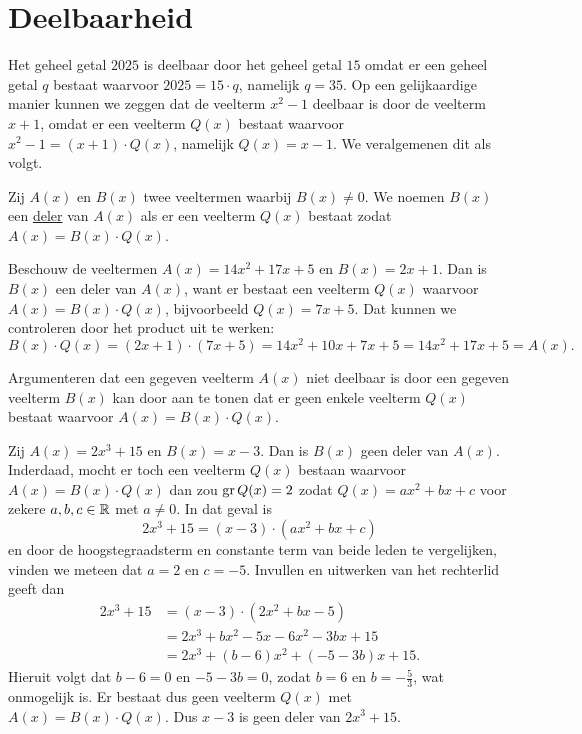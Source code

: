 \documentclass{ximera}
\begin{document}
\section{Deelbaarheid}

Het geheel getal $2025$ is deelbaar door het geheel getal $15$ omdat er een geheel getal $q$ bestaat waarvoor $2025 = 15\cdot q$, namelijk $q = 35$. Op een gelijkaardige manier kunnen we zeggen dat de veelterm $x^2-1$ deelbaar is door de veelterm $x+1$, omdat er een veelterm $Q(x)$ bestaat waarvoor $x^2-1 = (x+1)\cdot Q(x)$, namelijk $Q(x) = x-1$. We veralgemenen dit als volgt.

\begin{definition} 
Zij $A(x)$ en $B(x)$ twee veeltermen waarbij $B(x) \neq 0$. 
We noemen $B(x)$ een \underline{deler} van $A(x)$ als er een veelterm $Q(x)$ bestaat zodat $A(x) = B(x)\cdot Q(x)$.
\end{definition} 

\begin{example} 
Beschouw de veeltermen $A(x) = 14x^2+17x+5$ en $B(x) = 2x+1$. Dan is $B(x)$ een deler van $A(x)$, want er bestaat een veelterm $Q(x)$ waarvoor $A(x) = B(x) \cdot Q(x)$, bijvoorbeeld $Q(x) = 7x+5$. Dat kunnen we controleren door het product %
uit te werken:
\[
B(x) \cdot Q(x) = (2x+1) \cdot (7x+5) = 14x^2 + 10x + 7x + 5 = 14x^2 + 17x + 5 = A(x).
\]
\end{example} 

Argumenteren dat een gegeven veelterm $A(x)$ niet deelbaar is door een gegeven veelterm $B(x)$ kan door aan te tonen dat er geen enkele veelterm $Q(x)$ bestaat waarvoor $A(x) = B(x) \cdot Q(x)$. 

\begin{example} 
Zij $A(x) = 2x^3+15$ en $B(x) = x-3$. Dan is $B(x)$ geen deler van $A(x)$. Inderdaad, mocht er toch een veelterm $Q(x)$ bestaan waarvoor $A(x) = B(x) \cdot Q(x)$ dan zou $\operatorname{gr} Q(x) = 2$ zodat $Q(x) = a x^2 + b x + c$ voor zekere $a,b,c \in \mathbb{R}$ met $a \neq 0$. In dat geval is
\[
2x^3+15 = (x-3) \cdot (a x^2 + b x + c) 
\]
en door de hoogstegraadsterm en constante term van beide leden te vergelijken, vinden we meteen dat $a = 2$ en $c = -5$. Invullen en uitwerken van het rechterlid geeft dan
\begin{align*}
2x^3+15 
& = (x-3) \cdot (2 x^2 + b x - 5) \\
& = 2x^3 + bx^2 - 5x - 6x^2 - 3bx + 15 \\
& = 2x^3 + (b-6)x^2 + (-5-3b)x + 15.
\end{align*}
Hieruit volgt dat $b - 6 = 0$ en $-5-3b = 0$, zodat $b = 6$ en $b = -\frac{5}{3}$, wat onmogelijk is. Er bestaat dus geen veelterm $Q(x)$ met $A(x) = B(x) \cdot Q(x)$. Dus $x-3$ is geen deler van $2x^3+15$. 
\end{example} 
\end{document}
